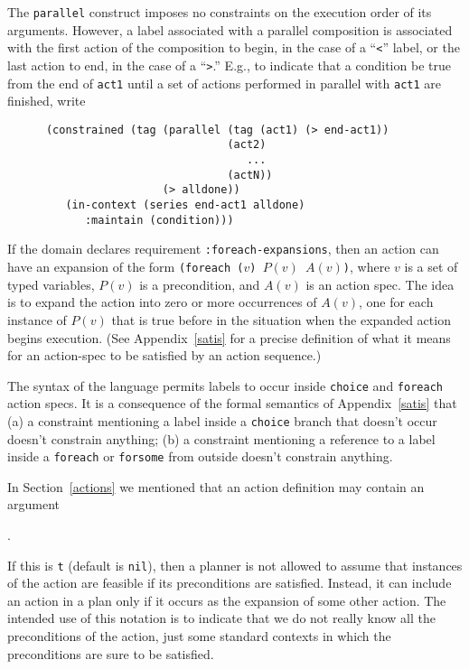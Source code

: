 The {\tt parallel} construct imposes no constraints on the execution order of its
arguments.  However, a label associated with a parallel composition is associated
with the first action of the composition
to begin, in the case of a ``{\tt <}'' label, or the last
action to end, in the case of a ``{\tt >}.''  E.g., to indicate that
a condition be true from the end of {\tt act1} 
until a set of actions performed in parallel with {\tt act1} are finished, write
\begin{verbatim}
      (constrained (tag (parallel (tag (act1) (> end-act1))
                                  (act2)
                                     ... 
                                  (actN))
                        (> alldone))
         (in-context (series end-act1 alldone)
            :maintain (condition)))
\end{verbatim}

If the domain declares requirement {\tt :foreach-expansions}, then an
action can have an expansion of the form {\tt (foreach ($v$) $P(v)$
$A(v)$)}, where $v$ is a set of typed variables, $P(v)$ is a
precondition, and $A(v)$ is an action spec.  The idea is to expand the
action into zero or more occurrences of $A(v)$, one for each instance
of $P(v)$ that is true before in the situation when the expanded
action begins execution.  
(See Appendix~\ref{satis} for a precise definition of what it means for
an action-spec to be satisfied by an action sequence.)

The syntax of the language permits labels to occur inside {\tt choice}
and {\tt foreach} action specs.  It is a consequence of the formal
semantics of Appendix~\ref{satis} that 
(a) a constraint mentioning a label
inside a {\tt choice} branch that doesn't occur doesn't constrain
anything; (b) a constraint mentioning a reference to a label inside a
{\tt foreach}  or {\tt forsome} from
outside doesn't constrain anything.  

In Section~\ref{actions} we mentioned that an action definition may
contain an argument 
\begin{tabbing}
.  
\end{tabbing}
If this is {\tt t}
(default is {\tt nil}), then a planner is not allowed to assume that
instances of the action are feasible if its preconditions are
satisfied.  Instead, it can include an action in a plan only if it
occurs as the expansion of some other action.  The intended use of
this notation is to indicate that we do not really know all the
preconditions of the action, just some standard contexts in which the
preconditions are sure to be satisfied.

